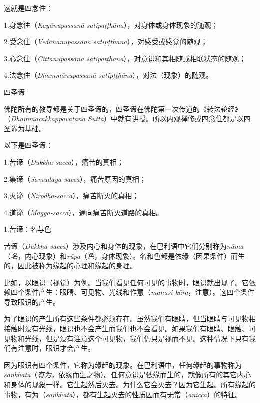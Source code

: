 这就是四念住：

{
\leftskip=1.6pc
\item{1.}身念住（{\it Kay\=anupassan\=a satipa\d t\d th\=ana}），对身体或身体现象的随观；
\item{2.}受念住（{\it Vedan\=anupassan\=a satip\d t\d th\=ana}），对感受或感觉的随观；
\item{3.}心念住（{\it Citt\=anupassan\=a satipa\d t\d th\=ana}），对意识和其相随或相联状态的随观；
\item{4.}\1法念住（{\it Dhamm\=anupassan\=a satip\d t\d th\=ana}），对法（现象）的随观。

}

\ssubsectnon 四圣谛

佛陀所有的教导都是关于四圣谛的，四圣谛在佛陀第一次传道的《转法轮经》（{\it Dhammacakkappavatana Sutta}）中就有讲授。所以内观禅修或四念住都是以四圣谛为基础。

以下是四圣谛：

{
\leftskip=1.6pc
\item{1.}苦谛（{\it Dukkha-sacca}），痛苦的真相；
\item{2.}集谛（{\it Samudaya-sacca}），痛苦原因的真相；
\item{3.}灭谛（{\it Nirodha-sacca}），痛苦断灭的真相；
\item{4.}道谛（{\it Magga-sacca}），通向痛苦断灭道路的真相。

}

\sssubsectnon 1.苦谛：名与色

苦谛（{\it Dukkha-sacca}）涉及内心和身体的现象，在巴利语中它们分别称为{\it n\=ama}（{\it 名}，内心现象）和{\it r\=upa}（{\it 色}，身体现象）。名和色都是依缘（因果条件）而生的，因此被称为缘起的心理和缘起的身理。

比如，以眼识（视觉）为例。当我们看见任何可见的事物时，眼识就出现了。它依赖四个条件产生：眼睛、可见物、光线和作意（{\it manasi-k\=ara}，注意）。这四个条件导致眼识的产生。

\1为了眼识的产生所有这些条件都必须存在。虽然我们有眼睛，但当眼睛与可见物相接触时没有光线，眼识也不会产生而我们也不会看见。如果我们有眼睛、眼触、可见物和光线，但是没有注意这个可见物，我们仍只是视而不见。这种情况下只有我们有注意时，眼识才会产生。

因为眼识有四个条件，它称为缘起的现象。在巴利语中，任何缘起的事物称为{\it sa\.nkhata}（{\it 有为}，依缘而生之物）。任何意识是依缘而生的，就像所有的其它内心和身体的现象一样。它生起然后灭去。为什么它会灭去？因为它生起。所有缘起的事物，有为（{\it sa\.nkhata}），都有生起灭去的性质因而有无常（{\it anicca}）的特征。

